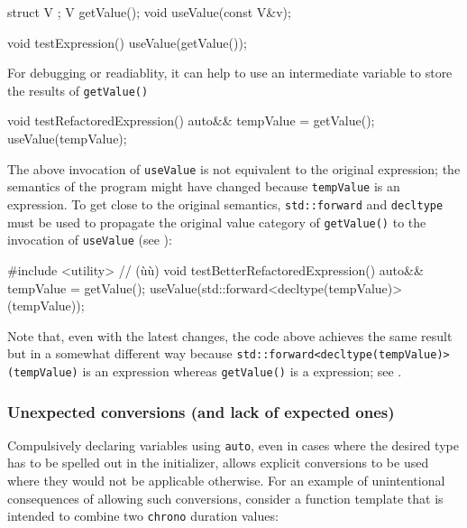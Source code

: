 \begin{emcppshiddenlisting}[emcppsbatch={e15,e15a,e16}]
struct V {};
V getValue();
void useValue(const V&v);
\end{emcppshiddenlisting}
\begin{emcppslisting}[emcppsbatch=e15]
void testExpression()
{
    useValue(getValue());
}
\end{emcppslisting}

For debugging or readiablity, it can help to use an intermediate variable to
store the results of \lstinline!getValue()!

\begin{emcppslisting}[emcppsbatch=e15a]
void testRefactoredExpression()
{
    auto&& tempValue = getValue();
    useValue(tempValue);
}
\end{emcppslisting}
    
\noindent The above invocation of \lstinline!useValue! is not equivalent to the
original expression; the semantics of the program might have changed because \lstinline!tempValue! is an  expression. To get
close to the original semantics, \lstinline!std::forward! and
\lstinline!decltype! must be used to propagate the original value category
of \lstinline!getValue()! to the invocation of \lstinline!useValue! (see
):

\begin{emcppslisting}[emcppsbatch=e16]
#include <utility>  // (ù{}ù)
void testBetterRefactoredExpression()
{
    auto&& tempValue = getValue();
    useValue(std::forward<decltype(tempValue)>(tempValue));
}
\end{emcppslisting}
    
\noindent Note that, even with the latest changes, the code above achieves the same result but in a somewhat different way because
 \lstinline!std::forward<decltype(tempValue)>(tempValue)! is
an  expression whereas \lstinline!getValue()! is a
 expression; see .

\subsubsection[Unexpected conversions (and lack of expected ones)]{Unexpected conversions (and lack of expected ones)}\label{unexpected-conversions-(and-lack-of-expected-ones)}

Compulsively declaring variables using \lstinline!auto!, even in cases
where the desired type has to be spelled out in the initializer, allows
explicit conversions to be used where they would not be applicable
otherwise. For an example of unintentional consequences of allowing such
conversions, consider a function template that is intended to combine
two \lstinline!chrono! duration values:


